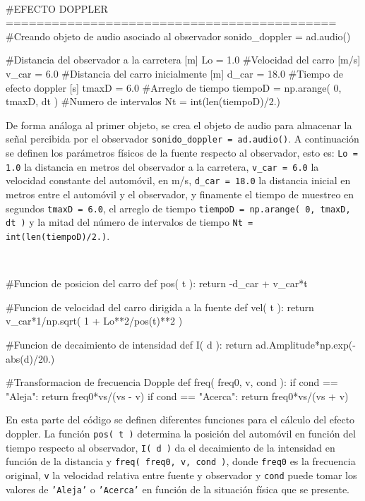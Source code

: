 \
\begin{listing}[style=python, numbers = none]
#EFECTO DOPPLER ===========================================
#Creando objeto de audio asociado al observador
sonido_doppler = ad.audio()

#Distancia del observador a la carretera [m]
Lo = 1.0
#Velocidad del carro [m/s]
v_car = 6.0
#Distancia del carro inicialmente [m]
d_car = 18.0
#Tiempo de efecto doppler [s]
tmaxD = 6.0
#Arreglo de tiempo
tiempoD = np.arange( 0, tmaxD, dt )
#Numero de intervalos
Nt = int(len(tiempoD)/2.)
\end{listing}
De forma análoga al primer objeto, se crea el objeto de audio para 
almacenar la señal percibida por el observador \texttt{sonido\_doppler = 
ad.audio()}. A continuación se definen los parámetros físicos de la fuente
respecto al observador, esto es: \texttt{Lo = 1.0} la distancia en metros
del observador a la carretera, \texttt{v\_car = 6.0} la velocidad constante
del automóvil, en m/s, \texttt{d\_car = 18.0} la distancia inicial en metros 
entre el automóvil y el observador, y finamente el tiempo de muestreo en 
segundos \texttt{tmaxD = 6.0}, el arreglo de tiempo \texttt{tiempoD = 
np.arange( 0, tmaxD, dt )} y la mitad del número de intervalos de tiempo
\texttt{Nt = int(len(tiempoD)/2.)}.

\
\begin{listing}[style=python, numbers = none]
#Funcion de posicion del carro
def pos( t ):
    return -d_car + v_car*t
    
#Funcion de velocidad del carro dirigida a la fuente
def vel( t ):
    return v_car*1/np.sqrt( 1 + Lo**2/pos(t)**2 )
    
#Funcion de decaimiento de intensidad
def I( d ):
    return ad.Amplitude*np.exp(-abs(d)/20.)
    
#Transformacion de frecuencia Dopple
def freq( freq0, v, cond ):
    if cond == "Aleja":
	return freq0*vs/(vs - v)
    if cond == "Acerca":
	return freq0*vs/(vs + v)
\end{listing}
En esta parte del código se definen diferentes funciones para el cálculo
del efecto doppler. La función \texttt{pos( t )} determina la posición del
automóvil en función del tiempo respecto al observador, \texttt{I( d )}
da el decaimiento de la intensidad en función de la distancia y 
\texttt{freq( freq0, v, cond )}, donde \texttt{freq0} es la frecuencia 
original, \texttt{v} la velocidad relativa entre fuente y observador y 
\texttt{cond} puede tomar los valores de \texttt{'Aleja'} o \texttt{'Acerca'}
en función de la situación física que se presente.


